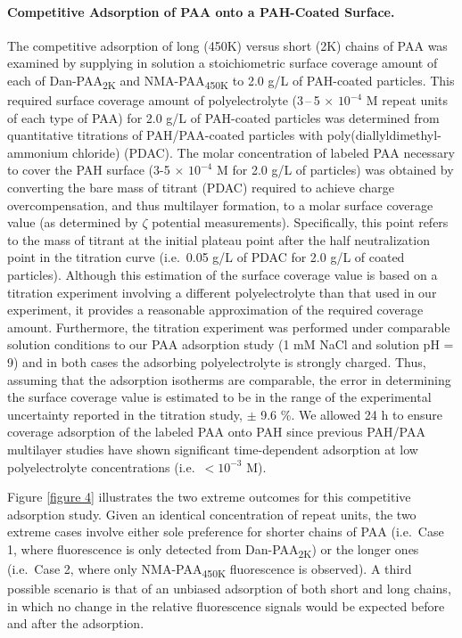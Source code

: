 \documentclass[twoside,twocolumn,9pt]{article}
\begin{document}
\paragraph{Competitive Adsorption of PAA onto a PAH-Coated Surface.}    %
    \label{sec-exp-compet}

The competitive adsorption of long (450K) versus short (2K) chains of PAA was examined by supplying in solution a stoichiometric surface coverage amount of each of Dan-PAA\textsubscript{2K} and NMA-PAA\textsubscript{450K} to 2.0 g/L of PAH-coated particles.  This required surface coverage amount of polyelectrolyte (3\,--\,5$\,\times \,10^{-4}$ M repeat units of each type of PAA) for 2.0 g/L of PAH-coated particles was determined from quantitative titrations of PAH/PAA-coated particles with poly(diallyldimethyl-ammonium chloride) (PDAC).\cite{Burke2003}   The molar concentration of labeled PAA necessary to cover the PAH surface (3-5 $\times$ $10^{-4}$ M for 2.0 g/L of particles) was obtained by converting the bare mass of titrant (PDAC) required to achieve charge overcompensation, and thus multilayer formation, to a molar surface coverage value (as determined by $\zeta$ potential measurements).\cite{Burke2003}   Specifically, this point refers to the mass of titrant at the initial plateau point after the half neutralization point in the titration curve (i.e.\ 0.05 g/L of PDAC for 2.0 g/L of coated particles).  Although this estimation of the surface coverage value is based on a titration experiment involving a different polyelectrolyte than that used in our experiment, it provides a reasonable approximation of the required coverage amount.  Furthermore, the titration experiment was performed under comparable solution conditions to our PAA adsorption study (1 mM NaCl and solution pH = 9) and in both cases the adsorbing polyelectrolyte is strongly charged.  Thus, assuming that the adsorption isotherms are comparable, the error in determining the surface coverage value is estimated to be in the range of the experimental uncertainty reported in the titration study, $\pm$ 9.6 \%.  We allowed 24 h to ensure coverage adsorption of the labeled PAA onto PAH since previous PAH/PAA multilayer studies have shown significant time-dependent adsorption at low polyelectrolyte concentrations (i.e.\ $<10^{-3}$ M).\cite{Mermut2003}

Figure \ref{figure 4} illustrates the two extreme outcomes for this competitive adsorption study.  Given an identical concentration of repeat units, the two extreme cases involve either sole preference for shorter chains of PAA (i.e.\ Case 1, where fluorescence is only detected from Dan-PAA\textsubscript{2K}) or the longer ones (i.e.\ Case 2, where only NMA-PAA\textsubscript{450K} fluorescence is observed).  A third possible scenario is that of an unbiased adsorption of both short and long chains, in which no change in the relative fluorescence signals would be expected before and after the adsorption. 
\end{document}
